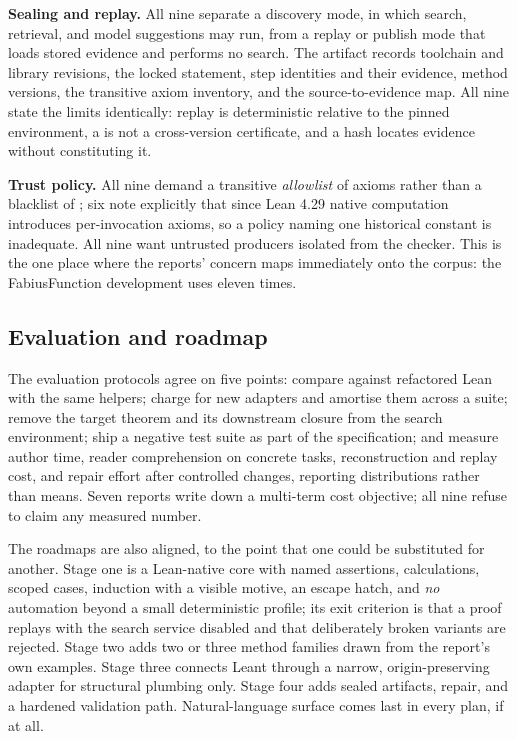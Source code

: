 \documentclass[11pt,a4paper]{article}
\newcommand{\code}[1]{\texttt{\detokenize{#1}}}
\theoremstyle{definition}
\begin{document}
\textbf{Sealing and replay.} All nine separate a discovery mode, in which search, retrieval, and model suggestions may run, from a replay or publish mode that loads stored evidence and performs no search. The artifact records toolchain and library revisions, the locked statement, step identities and their evidence, method versions, the transitive axiom inventory, and the source-to-evidence map. All nine state the limits identically: replay is deterministic relative to the pinned environment, a \code{.olean} is not a cross-version certificate, and a hash locates evidence without constituting it.

\textbf{Trust policy.} All nine demand a transitive \emph{allowlist} of axioms rather than a blacklist of \code{sorryAx}; six note explicitly that since Lean 4.29 native computation introduces per-invocation axioms, so a policy naming one historical constant is inadequate. All nine want untrusted producers isolated from the checker. This is the one place where the reports' concern maps immediately onto the corpus: the FabiusFunction development uses \code{native_decide} eleven times.

\subsection{Evaluation and roadmap}
The evaluation protocols agree on five points: compare against refactored Lean with the same helpers; charge for new adapters and amortise them across a suite; remove the target theorem and its downstream closure from the search environment; ship a negative test suite as part of the specification; and measure author time, reader comprehension on concrete tasks, reconstruction and replay cost, and repair effort after controlled changes, reporting distributions rather than means. Seven reports write down a multi-term cost objective; all nine refuse to claim any measured number.

The roadmaps are also aligned, to the point that one could be substituted for another. Stage one is a Lean-native core with named assertions, calculations, scoped cases, induction with a visible motive, an escape hatch, and \emph{no} automation beyond a small deterministic profile; its exit criterion is that a proof replays with the search service disabled and that deliberately broken variants are rejected. Stage two adds two or three method families drawn from the report's own examples. Stage three connects Leant through a narrow, origin-preserving adapter for structural plumbing only. Stage four adds sealed artifacts, repair, and a hardened validation path. Natural-language surface comes last in every plan, if at all.
\end{document}
